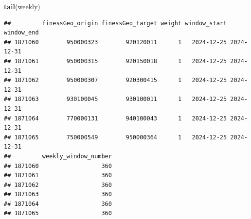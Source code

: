 \documentclass[
]{article}
\newenvironment{Shaded}{\begin{snugshade}}{\end{snugshade}}
\newcommand{\FunctionTok}[1]{\textcolor[rgb]{0.13,0.29,0.53}{\textbf{#1}}}
\newcommand{\NormalTok}[1]{#1}
\begin{document}
\begin{Shaded}
\begin{Highlighting}[]
\FunctionTok{tail}\NormalTok{(weekly)}
\end{Highlighting}
\end{Shaded}

\begin{verbatim}
##         finessGeo_origin finessGeo_target weight window_start window_end
## 1871060        950000323        920120011      1   2024-12-25 2024-12-31
## 1871061        950000315        920150018      1   2024-12-25 2024-12-31
## 1871062        950000307        920300415      1   2024-12-25 2024-12-31
## 1871063        930100045        930100011      1   2024-12-25 2024-12-31
## 1871064        770000131        940100043      1   2024-12-25 2024-12-31
## 1871065        750000549        950000364      1   2024-12-25 2024-12-31
##         weekly_window_number
## 1871060                  360
## 1871061                  360
## 1871062                  360
## 1871063                  360
## 1871064                  360
## 1871065                  360
\end{verbatim}
\end{document}
